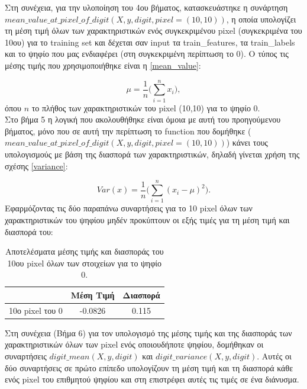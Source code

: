 \documentclass[11pt]{article} %
\begin{document}
Στη συνέχεια, για την υλοποίηση του 4ου βήματος, κατασκευάστηκε η συνάρτηση $mean\_value\_at\_pixel\_of\_digit(X, y, digit, pixel=(10, 10))$, η οποία υπολογίζει τη μέση τιμή όλων των χαρακτηριστικών ενός συγκεκριμένου pixel (συγκεκριμένα του 10ου) για το training set και δέχεται σαν input  τα train\_features, τα train\_labels και το ψηφίο που μας ενδιαφέρει (στη συγκεκριμένη περίπτωση το 0). Ο τύπος τις μέσης τιμής που χρησιμοποιήθηκε είναι η \ref{mean_value}: 

\begin{equation}
\label{mean_value}
\mu = \frac{1}{n}\bigg(\sum_{i=1}^{n}x_{i}\bigg),
\end{equation}
όπου $n$ το πλήθος των χαρακτηριστικών του pixel (10,10) για το ψηφίο 0.
\\

Στο βήμα 5 η λογική που ακολουθήθηκε είναι όμοια με αυτή του προηγούμενου βήματος, μόνο που σε αυτή την περίπτωση το function που δομήθηκε ($mean\_value\_at\_pixel\_of\_digit(X, y, digit, pixel=(10, 10))$) κάνει τους υπολογισμούς με βάση της διασπορά των χαρακτηριστικών, δηλαδή γίνεται χρήση της σχέσης \ref{variance}: 

\begin{equation}
\label{variance}
Var(x) = \frac{1}{n}\bigg(\sum_{i=1}^{n}(x_{i}-\mu)^{2}\bigg).
\end{equation}
Εφαρμόζοντας τις δύο παραπάνω συναρτήσεις για το 10 pixel όλων των χαρακτηριστικών του ψηφίου μηδέν προκύπτουν οι εξής τιμές για τη μέση τιμή και διασπορά του:

\begin{table}[h]
\begin{center}
\begin{tabular}{c c c}
\hline\hline
 & Μέση Τιμή & Διασπορά\\
\hline
10ο pixel του 0 & -0.0826 & 0.115\\
\hline 
\end{tabular}
\caption{Αποτελέσματα μέσης τιμής και διασποράς του 10ου pixel όλων των στοιχείων για το ψηφίο 0.}
\end{center}
\end{table}

Στη συνέχεια (Βήμα 6) για τον υπολογισμό της μέσης τιμής και της διασποράς των χαρακτηριστικών όλων των pixel ενός οποιουδήποτε ψηφίου, δομήθηκαν οι συναρτήσεις $digit\_mean(X, y, digit)$ και $digit\_variance(X, y, digit)$. Αυτές οι δύο συναρτήσεις σε πρώτο επίπεδο υπολογίζουν τη μέση τιμή και τη διασπορά κάθε ενός pixel του επιθμητού ψηφίου και στη επιστρέφει αυτές τις τιμές σε ένα διάνυσμα. 
\end{document}
